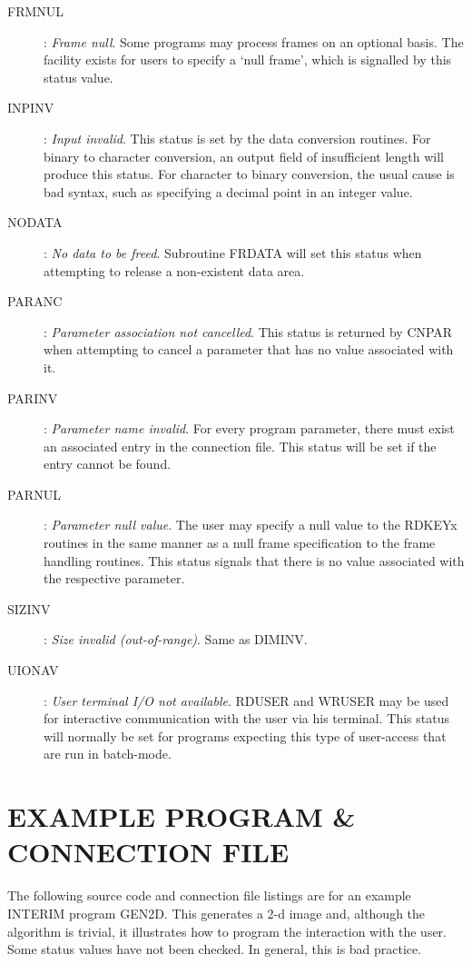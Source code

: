 \begin{description}
\item [FRMNUL]:
{\em Frame null}.
Some programs may process frames on an optional basis.
The facility exists for users to specify a `null frame', which is signalled by
this status value.
\item [INPINV]:
{\em Input invalid}.
This status is set by the data conversion routines.
For binary to character conversion, an output field of insufficient length will
produce this status.
For character to binary conversion, the usual cause is bad syntax, such as
specifying a decimal point in an integer value.
\item [NODATA]:
{\em No data to be freed}.
Subroutine FRDATA will set this status when attempting to release a non-existent
data area.
\item [PARANC]:
{\em Parameter association not cancelled}.
This status is returned by CNPAR when attempting to cancel a parameter that has
no value associated with it.
\item [PARINV]:
{\em Parameter name invalid}.
For every program parameter, there must exist an associated entry in the
connection file.
This status will be set if the entry cannot be found.
\item [PARNUL]:
{\em Parameter null value}.
The user may specify a null value to the RDKEYx routines in the same manner as a
null frame specification to the frame handling routines.
This status signals that there is no value associated with the respective
parameter.
\item [SIZINV]:
{\em Size invalid (out-of-range)}.
Same as DIMINV.
\item [UIONAV]:
{\em User terminal I/O not available}.
RDUSER and WRUSER may be used for interactive communication with the user via
his terminal.
This status will normally be set for programs expecting this type of
user-access that are run in batch-mode.
\end{description}
\section {EXAMPLE PROGRAM \& CONNECTION FILE}
The following source code and connection file listings are for an example
INTERIM program GEN2D.
This generates a 2-d image and, although the algorithm is trivial, it
illustrates how to program the interaction with the user.
Some status values have not been checked.
In general, this is bad practice.

